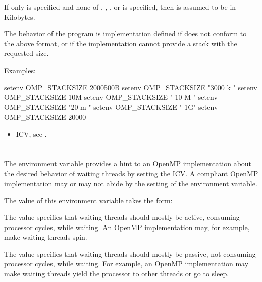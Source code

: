 If only  is specified and none of , , , or  
is specified, then  is assumed to be in Kilobytes.

The behavior of the program is implementation defined if  does not 
conform to the above format, or if the implementation cannot provide a stack with the 
requested size.

Examples:
\begin{boxedcode}
setenv OMP\_STACKSIZE 2000500B 
setenv OMP\_STACKSIZE "3000 k " 
setenv OMP\_STACKSIZE 10M 
setenv OMP\_STACKSIZE " 10 M "
setenv OMP\_STACKSIZE "20 m " 
setenv OMP\_STACKSIZE " 1G" 
setenv OMP\_STACKSIZE 20000 
\end{boxedcode}

\crossreferences
\begin{itemize}
\item {} ICV, see .
\end{itemize}









\section{}
\label{sec:OMP_WAIT_POLICY}
The  environment variable provides a hint to an OpenMP 
implementation about the desired behavior of waiting threads by setting the 
 ICV. A compliant OpenMP implementation may or may not abide by the setting of 
the environment variable.

The value of this environment variable takes the form:


The  value specifies that waiting threads should mostly be active, consuming 
processor cycles, while waiting. An OpenMP implementation may, for example, make 
waiting threads spin. 

The  value specifies that waiting threads should mostly be passive, not 
consuming processor cycles, while waiting. For example, an OpenMP implementation 
may make waiting threads yield the processor to other threads or go to sleep.

